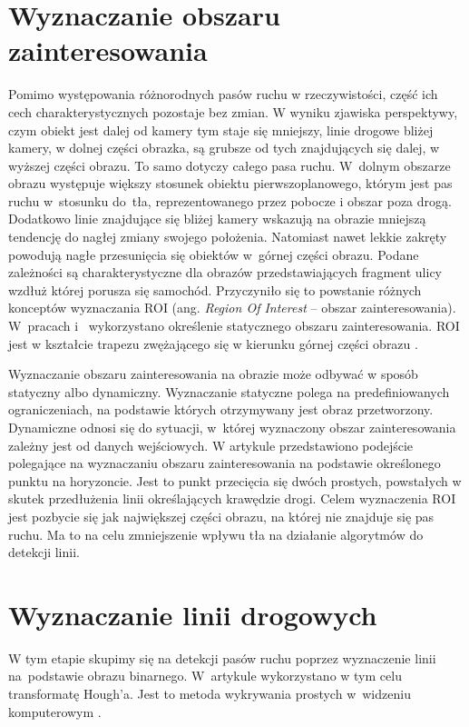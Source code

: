 \section{Wyznaczanie obszaru zainteresowania}
Pomimo występowania różnorodnych pasów ruchu w rzeczywistości, część ich cech charakterystycznych pozostaje bez zmian.
W wyniku zjawiska perspektywy, czym obiekt jest dalej od kamery tym staje się mniejszy, linie drogowe bliżej kamery, w dolnej części obrazka, są grubsze od tych znajdujących się dalej, w wyższej części obrazu.
To samo dotyczy całego pasa ruchu. W~dolnym obszarze obrazu występuje większy stosunek obiektu pierwszoplanowego, którym jest pas ruchu w~stosunku do~tła, reprezentowanego przez pobocze i obszar poza drogą.
Dodatkowo linie znajdujące się bliżej kamery wskazują na obrazie mniejszą tendencję do nagłej zmiany swojego położenia.
Natomiast nawet lekkie zakręty powodują nagłe przesunięcia się obiektów w~górnej części obrazu.
Podane zależności są charakterystyczne dla obrazów przedstawiających fragment ulicy wzdłuż której porusza się samochód.
Przyczyniło się to powstanie różnych konceptów wyznaczania ROI (ang. \textit{Region Of Interest} -- obszar zainteresowania).
W~pracach \cite{2} i~\cite{4} wykorzystano określenie statycznego obszaru zainteresowania.
ROI jest w kształcie trapezu zwężającego się w kierunku górnej części obrazu \cite{4}.

Wyznaczanie obszaru zainteresowania na obrazie może odbywać w sposób statyczny albo dynamiczny. 
Wyznaczanie statyczne polega na predefiniowanych ograniczeniach, na podstawie których otrzymywany jest obraz przetworzony. 
Dynamiczne odnosi się do sytuacji, w~której wyznaczony obszar zainteresowania zależny jest od danych wejściowych. 
W artykule \cite{vanishing_point} przedstawiono podejście polegające na wyznaczaniu obszaru zainteresowania na podstawie określonego punktu na horyzoncie.
Jest to punkt przecięcia się dwóch prostych, powstałych w skutek przedłużenia linii określających krawędzie drogi. 
Celem wyznaczenia ROI jest pozbycie się jak największej części obrazu, na której nie znajduje się pas ruchu.
Ma to na celu zmniejszenie wpływu tła na działanie algorytmów do detekcji linii.

\section{Wyznaczanie linii drogowych}
W tym etapie skupimy się na detekcji pasów ruchu poprzez wyznaczenie linii na~podstawie obrazu binarnego. 
W~artykule \cite{reichenbach_comparison} wykorzystano w tym celu transformatę Hough'a. 
Jest to metoda wykrywania prostych w~widzeniu komputerowym \cite{hough}.


